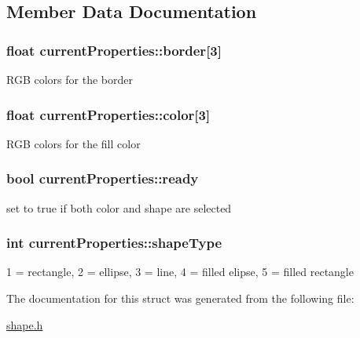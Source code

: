 \subsection{Member Data Documentation}
\hypertarget{structcurrentProperties_aa67742be2101d7049d5503f7d5a2e3a5}{
\subsubsection[{border}]{\setlength{\rightskip}{0pt plus 5cm}float current\-Properties\-::border\mbox{[}3\mbox{]}}}\label{structcurrentProperties_aa67742be2101d7049d5503f7d5a2e3a5}
R\-G\-B colors for the border \hypertarget{structcurrentProperties_a444727aa40fea7fd0020434b7ebc9245}{
\subsubsection[{color}]{\setlength{\rightskip}{0pt plus 5cm}float current\-Properties\-::color\mbox{[}3\mbox{]}}}\label{structcurrentProperties_a444727aa40fea7fd0020434b7ebc9245}
R\-G\-B colors for the fill color \hypertarget{structcurrentProperties_a73bc7474c39c0b1580577ad635074c67}{
\subsubsection[{ready}]{\setlength{\rightskip}{0pt plus 5cm}bool current\-Properties\-::ready}}\label{structcurrentProperties_a73bc7474c39c0b1580577ad635074c67}
set to true if both color and shape are selected \hypertarget{structcurrentProperties_a3fb7d1d3f56132c1530f1a2a307a3172}{
\subsubsection[{shape\-Type}]{\setlength{\rightskip}{0pt plus 5cm}int current\-Properties\-::shape\-Type}}\label{structcurrentProperties_a3fb7d1d3f56132c1530f1a2a307a3172}
1 = rectangle, 2 = ellipse, 3 = line, 4 = filled elipse, 5 = filled rectangle 

The documentation for this struct was generated from the following file\-:\begin{DoxyCompactItemize}
\item 
\hyperlink{shape_8h}{shape.\-h}\end{DoxyCompactItemize}
